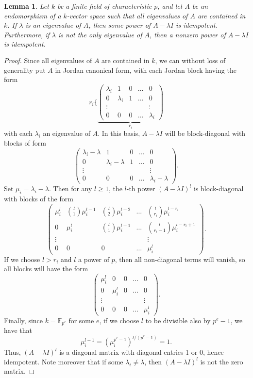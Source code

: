 \documentclass[12pt]{article}
\let\l\lambda
\def\FF{\mathbb F}
\theoremstyle{theorem}
\numberwithin{thm}{section}
\newtheorem{lem}[thm]{Lemma}
\theoremstyle{definition}
\begin{document}
\begin{lem}\label{lem:jordan}
  Let $k$ be a finite field of characteristic $p$, and let $A$ be an endomorphism of a $k$-vector space such that all eigenvalues of $A$ are contained in $k$. If $\l$ is an eigenvalue of $A$, then some power of $A-\l I$ is idempotent.
Furthermore, if $\l$ is not the only eigenvalue of $A$, then a  nonzero power of $A-\l I$ is idempotent.
\end{lem}
\begin{proof}
  Since all eigenvalues of $A$ are contained in $k$, we can without loss of generality put $A$ in Jordan canonical form, with each Jordan block having the form
  \[ r_i\Biggl\{
  \underbrace{\begin{pmatrix}
      \l_i & 1 & 0 & \dots & 0 \\
      0 & \l_i & 1  & \dots & 0 \\
      \vdots & & & & \vdots \\
      0 & 0 & 0 & \dots & \l_i
  \end{pmatrix}}_{r_i} \]
  with each $\l_i$ an eigenvalue of $A$.
  In this basis, $A-\l I$ will be block-diagonal with blocks of form
  \[ \begin{pmatrix}
    \l_i-\l & 1 & 0 & \dots & 0 \\
    0 & \l_i-\l & 1 & \dots & 0 \\
    \vdots & & & & \vdots \\
    0 & 0 & 0 & \dots & \l_i-\l
  \end{pmatrix}. \]
  Set $\mu_i=\l_i-\l$. Then for any $l\geq 1$, the $l$-th power $(A-\l I)^l$ is block-diagonal with blocks of the form
  \[ \begin{pmatrix}
    \mu_i^l & \binom{l}1\mu_i^{l-1} & \binom{l}2\mu_i^{l-2} & \dots & \binom{l}{r_i}\mu_i^{l-r_i} \\
    0 & \mu_i^l & \binom{l}1\mu_i^{l-1} & \dots & \binom{l}{r_i-1}\mu_i^{l-r_i+1} \\
    \vdots & & & & \vdots \\
    0 & 0 & 0 & \dots & \mu_i^l
  \end{pmatrix}. \]
  If we choose $l > r_i$ and $l$ a power of $p$, then all non-diagonal terms will vanish, so all blocks will have the form
  \[ \begin{pmatrix}
    \mu_i^l & 0 & 0 & \dots & 0 \\
    0 & \mu_i^l & 0 & \dots & 0 \\
    \vdots & & & & \vdots \\
    0 & 0 & 0 & \dots & \mu_i^l
  \end{pmatrix}. \]
  Finally, since $k=\FF_{p^e}$ for some $e$, if we choose $l$ to be divisible also by $p^e-1$, we have that $$\mu_i^{l-1} = (\mu_i^{p^{e}-1})^{l/(p^{e}-1)} =1.$$
  Thus, $(A-\l I)^l$ is a diagonal matrix with diagonal entries 1 or 0, hence idempotent. Note moreover that if some $\l_i\neq \l$, then $(A-\l I)^l$ is not the zero matrix.
\end{proof}
\end{document}
